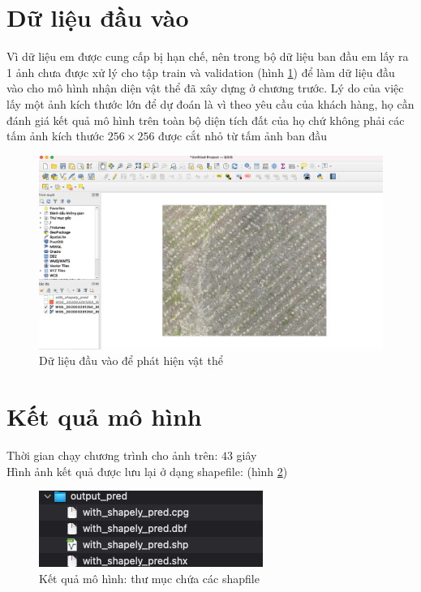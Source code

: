 \documentclass[a4paper, 12pt]{report}
\begin{document}
\section{Dữ liệu đầu vào}
Vì dữ liệu em được cung cấp bị hạn chế, nên trong bộ dữ liệu ban đầu em lấy ra 1 ảnh chưa được xử lý cho tập train và validation (hình \ref{fig:demo}) để làm dữ liệu đầu vào cho mô hình nhận diện vật thể đã xây dựng ở chương trước.  Lý do của việc lấy một ảnh kích thước lớn để dự đoán là vì theo yêu cầu của khách hàng,  họ cần đánh giá kết quả mô hình trên toàn bộ diện tích đất của họ chứ không phải các tấm ảnh kích thước $256 \times 256$ được cắt nhỏ từ tấm ảnh ban đầu
 \begin{figure}[!h]
	\centering
	\includegraphics[width=1\linewidth]{Images/demo}
	\caption{Dữ liệu đầu vào để phát hiện vật thể}
	\label{fig:demo}
\end{figure}

\section{Kết quả mô hình}
Thời gian chạy chương trình cho ảnh trên: $43$ giây \\
Hình ảnh kết quả được lưu lại ở dạng shapefile: 	(hình \ref{fig:shpfile_demo_result})
 \begin{figure}[!h]
	\centering
	\includegraphics[width=0.5\linewidth]{Images/shpfile_demo_result}
	\caption{Kết quả mô hình: thư mục chứa các shapfile}
	\label{fig:shpfile_demo_result}
\end{figure}
\end{document}

